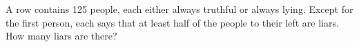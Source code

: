 A row contains 125 people, each either always truthful or always lying. Except for the first person, each says that at least half of the people to their left are liars. How many liars are there?
